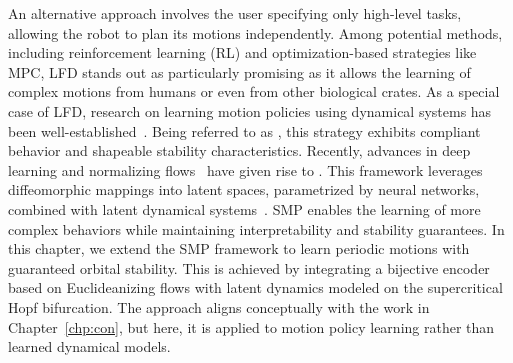 \begin{foreword}
    An alternative approach involves the user specifying only high-level tasks, allowing the robot to plan its motions independently. Among potential methods, including reinforcement learning (RL) and optimization-based strategies like \gls{MPC}, \gls{LFD} stands out as particularly promising as it allows the learning of complex motions from humans or even from other biological crates. As a special case of \gls{LFD}, research on learning motion policies using dynamical systems has been well-established~\cite{ijspeert2013dynamical}. Being referred to as , this strategy exhibits compliant behavior and shapeable stability characteristics. Recently, advances in deep learning and normalizing flows~\cite{kobyzev2020normalizing} have given rise to . This framework leverages diffeomorphic mappings into latent spaces, parametrized by neural networks, combined with latent dynamical systems~\cite{rana2020euclideanizing, perez2023stable, zhi2024teaching}. \gls{SMP} enables the learning of more complex behaviors while maintaining interpretability and stability guarantees.
    In this chapter, we extend the \gls{SMP} framework to learn periodic motions with guaranteed orbital stability. This is achieved by integrating a bijective encoder based on Euclideanizing flows with latent dynamics modeled on the supercritical Hopf bifurcation. The approach aligns conceptually with the work in Chapter~\ref{chp:con}, but here, it is applied to motion policy learning rather than learned dynamical models.
\end{foreword}


\pagebreak

